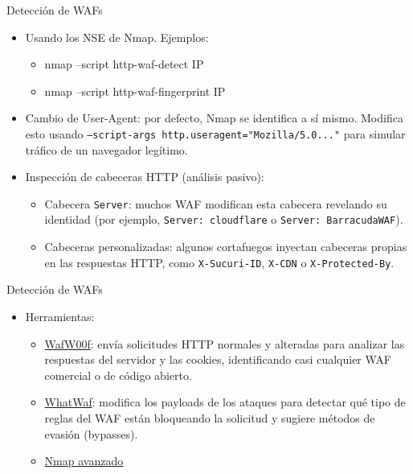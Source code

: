 \documentclass[aspectratio=169,11pt]{beamer}
\newcommand{\cmd}[1]{\texttt{\color{uznavy}#1}}
\newcommand{\cmdbox}[1]{%
  \begin{center}%
  {\setlength{\fboxsep}{6pt}\colorbox{uzlav!40}{\parbox{0.88\linewidth}{\ttfamily\footnotesize #1}}}%
  \end{center}}
\begin{document}
\begin{frame}{Detección de WAFs}
\small
  \begin{itemize}
  \item Usando los NSE de Nmap. Ejemplos:
    \begin{itemize}
    \item[] \cmdbox{nmap --script http-waf-detect IP}
    \item[] \cmdbox{nmap --script http-waf-fingerprint IP}
    \end{itemize}
  \item Cambio de User-Agent: por defecto, Nmap se identifica a sí mismo. Modifica esto usando \cmd{--script-args http.useragent="Mozilla/5.0..."} para simular tráfico de un navegador legítimo.
  \item Inspección de cabeceras HTTP (análisis pasivo):
    \begin{itemize}
    \item Cabecera \cmd{Server}: muchos WAF modifican esta cabecera revelando su identidad (por ejemplo, \cmd{Server: cloudflare} o \cmd{Server: BarracudaWAF}).
    \item Cabeceras personalizadas: algunos cortafuegos inyectan cabeceras propias en las respuestas HTTP, como \cmd{X-Sucuri-ID}, \cmd{X-CDN} o \cmd{X-Protected-By}.
    \end{itemize}
  \end{itemize}
\end{frame}

\begin{frame}[allowframebreaks]{Detección de WAFs}
\small
  \begin{itemize}
  \item Herramientas:
    \begin{itemize}
    \item \href{https://github.com/EnableSecurity/wafw00f}{WafW00f}: envía solicitudes HTTP normales y alteradas para analizar las respuestas del servidor y las cookies, identificando casi cualquier WAF comercial o de código abierto.
    \item \href{https://github.com/Ekultek/WhatWaf}{WhatWaf}: modifica los payloads de los ataques para detectar qué tipo de reglas del WAF están bloqueando la solicitud y sugiere métodos de evasión (bypasses).
    \item \href{https://github.com/Y000o/Nmap/blob/main/Nmap_medio_Avanzado.md}{Nmap avanzado}
    \end{itemize}
  \end{itemize}
\end{frame}
\end{document}
